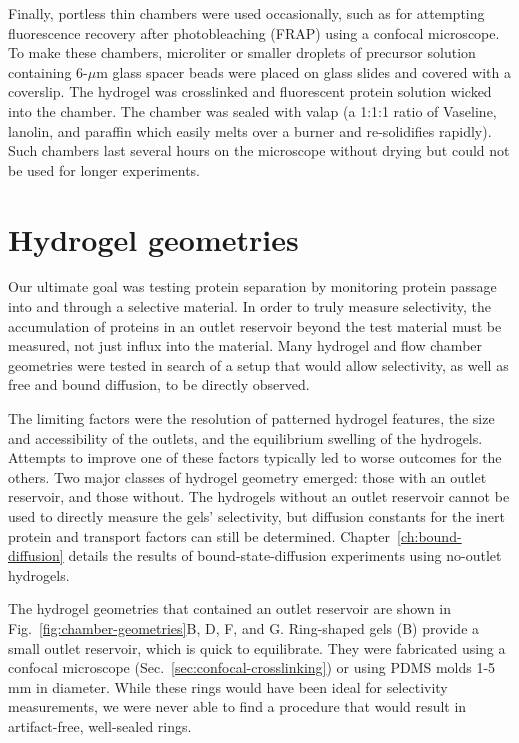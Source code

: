 Finally, portless thin chambers were used occasionally, such as for attempting fluorescence recovery after photobleaching (FRAP) using a confocal microscope.  To make these chambers, microliter or smaller droplets of precursor solution containing 6-$\mu$m glass spacer beads were placed on glass slides and covered with a coverslip.  The hydrogel was crosslinked and fluorescent protein solution wicked into the chamber.  The chamber was sealed with valap (a 1:1:1 ratio of Vaseline, lanolin, and paraffin which easily melts over a burner and re-solidifies rapidly).  Such chambers last several hours on the microscope without drying but could not be used for longer experiments.

\section{Hydrogel geometries}
\label{sec:gel-geometries}

Our ultimate goal was testing protein separation by monitoring protein passage into and through a selective material.  In order to truly measure selectivity, the accumulation of proteins in an outlet reservoir beyond the test material must be measured, not just influx into the material.  Many hydrogel and flow chamber geometries were tested in search of a setup that would allow selectivity, as well as free and bound diffusion, to be directly observed.

The limiting factors were the resolution of patterned hydrogel features, the size and accessibility of the outlets, and the equilibrium swelling of the hydrogels.  Attempts to improve one of these factors typically led to worse outcomes for the others.  Two major classes of hydrogel geometry emerged: those with an outlet reservoir, and those without.  The hydrogels without an outlet reservoir cannot be used to directly measure the gels' selectivity, but diffusion constants for the inert protein and transport factors can still be determined.  Chapter~\ref{ch:bound-diffusion} details the results of bound-state-diffusion experiments using no-outlet hydrogels.

The hydrogel geometries that contained an outlet reservoir are shown in Fig.~\ref{fig:chamber-geometries}B, D, F, and G.  Ring-shaped gels (B) provide a small outlet reservoir, which is quick to equilibrate.  They were fabricated using a confocal microscope (Sec.~\ref{sec:confocal-crosslinking}) or using PDMS molds 1-5 mm in diameter.  While these rings would have been ideal for selectivity measurements, we were never able to find a procedure that would result in artifact-free, well-sealed rings.

